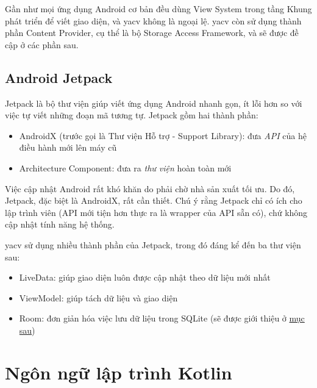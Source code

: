 \documentclass[../../thesis]{subfiles}
\begin{document}
Gần như mọi ứng dụng Android cơ bản đều dùng View System trong tầng Khung phát
triển để viết giao diện, và yacv không là ngoại lệ. yacv còn sử dụng thành phần
Content Provider, cụ thể là bộ Storage Access Framework, và sẽ được đề cập ở các
phần sau.

\subsection{Android Jetpack}\label{sec:jetpack}

Jetpack là bộ thư viện giúp viết ứng dụng Android nhanh gọn, ít lỗi hơn so với
việc tự viết những đoạn mã tương tự. Jetpack gồm hai thành phần:

\begin{itemize}
    \item
        AndroidX (trước gọi là Thư viện Hỗ trợ - Support Library): đưa
        \emph{API} của hệ điều hành mới lên máy cũ
    \item
        Architecture Component: đưa ra \emph{thư viện} hoàn toàn mới
\end{itemize}

Việc cập nhật Android rất khó khăn do phải chờ nhà sản xuất tối ưu. Do đó,
Jetpack, đặc biệt là AndroidX, rất cần thiết. Chú ý rằng Jetpack chỉ có ích cho
lập trình viên (API mới tiện hơn thực ra là wrapper của API sẵn có), chứ không
cập nhật tính năng hệ thống.

yacv sử dụng nhiều thành phần của Jetpack, trong đó đáng kể đến ba thư viện sau:

\begin{itemize}
    \item
        LiveData: giúp giao diện luôn được cập nhật theo dữ liệu mới nhất
    \item
        ViewModel: giúp tách dữ liệu và giao diện
    \item
        Room: đơn giản hóa việc lưu dữ liệu trong SQLite (sẽ được giới thiệu ở
        \hyperref[sec:room]{mục sau})
\end{itemize}



\section{Ngôn ngữ lập trình Kotlin}\label{sec:kotlin}
\end{document}
